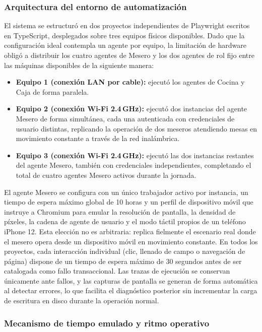 \subsubsection*{Arquitectura del entorno de automatización}

El sistema se estructuró en dos proyectos independientes de Playwright escritos en TypeScript, desplegados sobre tres equipos físicos disponibles. Dado que la configuración ideal contempla un agente por equipo, la limitación de hardware obligó a distribuir los cuatro agentes de Mesero y los dos agentes de rol fijo entre las máquinas disponibles de la siguiente manera:

\begin{itemize}
	\item \textbf{Equipo 1 (conexión LAN por cable):} ejecutó los agentes de Cocina y Caja de forma paralela.
	\item \textbf{Equipo 2 (conexión Wi-Fi 2.4\,GHz):} ejecutó dos instancias del agente Mesero de forma simultánea, cada una autenticada con credenciales de usuario distintas, replicando la operación de dos meseros atendiendo mesas en movimiento constante a través de la red inalámbrica.
	\item \textbf{Equipo 3 (conexión Wi-Fi 2.4\,GHz):} ejecutó las dos instancias restantes del agente Mesero, también con credenciales independientes, completando el total de cuatro agentes Mesero activos durante la jornada.
\end{itemize}

El agente Mesero se configura con un único trabajador activo por instancia, un tiempo de espera máximo global de 10 horas y un perfil de dispositivo móvil que instruye a Chromium para emular la resolución de pantalla, la densidad de píxeles, la cadena de agente de usuario y el modo táctil propios de un teléfono iPhone 12. Esta elección no es arbitraria: replica fielmente el escenario real donde el mesero opera desde un dispositivo móvil en movimiento constante. En todos los proyectos, cada interacción individual (clic, llenado de campo o navegación de página) dispone de un tiempo de espera máximo de 30 segundos antes de ser catalogada como fallo transaccional. Las trazas de ejecución se conservan únicamente ante fallos, y las capturas de pantalla se generan de forma automática al detectar errores, lo que facilita el diagnóstico posterior sin incrementar la carga de escritura en disco durante la operación normal.

\subsubsection*{Mecanismo de tiempo emulado y ritmo operativo}

